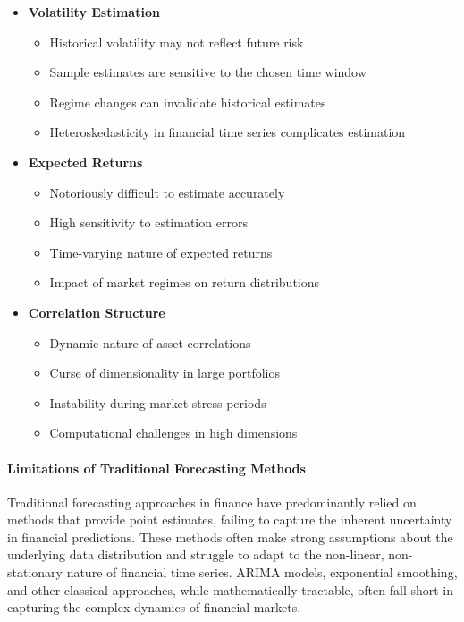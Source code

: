 \begin{itemize}
    \item \textbf{Volatility Estimation}
    \begin{itemize}
        \item Historical volatility may not reflect future risk
        \item Sample estimates are sensitive to the chosen time window
        \item Regime changes can invalidate historical estimates
        \item Heteroskedasticity in financial time series complicates estimation
    \end{itemize}

    \item \textbf{Expected Returns}
    \begin{itemize}
        \item Notoriously difficult to estimate accurately
        \item High sensitivity to estimation errors
        \item Time-varying nature of expected returns
        \item Impact of market regimes on return distributions
    \end{itemize}

    \item \textbf{Correlation Structure}
    \begin{itemize}
        \item Dynamic nature of asset correlations
        \item Curse of dimensionality in large portfolios
        \item Instability during market stress periods
        \item Computational challenges in high dimensions
    \end{itemize}
\end{itemize}

\paragraph{Limitations of Traditional Forecasting Methods}
Traditional forecasting approaches in finance have predominantly relied on methods that provide point estimates, failing to capture the inherent uncertainty in financial predictions. These methods often make strong assumptions about the underlying data distribution and struggle to adapt to the non-linear, non-stationary nature of financial time series. ARIMA models, exponential smoothing, and other classical approaches, while mathematically tractable, often fall short in capturing the complex dynamics of financial markets.

